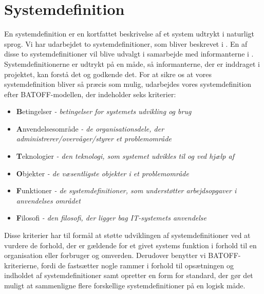 \section{Systemdefinition}
\label{sec:systemdefinition}

En systemdefinition er en kortfattet beskrivelse af et system udtrykt i naturligt sprog. Vi har udarbejdet to systemdefinitioner, som bliver beskrevet i . En af disse to systemdefinitioner vil blive udvalgt i samarbejde med informanterne i  . Systemdefinitionerne er udtrykt på en måde, så informanterne, der er inddraget i projektet, kan forstå det og godkende det. For at sikre os at vores systemdefinition bliver så præcis som mulig, udarbejdes vores systemdefinition efter BATOFF-modellen, der indeholder seks kriterier\cite[s.~37]{ooad}:

\begin{itemize}[noitemsep]
\item \textbf{B}etingelser \textit{- betingelser for systemets udvikling og brug}
\item \textbf{A}nvendelsesområde \textit{- de organisationsdele, der administrerer/overvåger/styrer et problemområde}
\item \textbf{T}eknologier \textit{- den teknologi, som systemet udvikles til og ved hjælp af}
\item \textbf{O}bjekter \textit{- de væsentligste objekter i et problemområde}
\item \textbf{F}unktioner \textit{- de systemdefinitioner, som understøtter arbejdsopgaver i anvendelses området}
\item \textbf{F}ilosofi \textit{- den filosofi, der ligger bag IT-systemets anvendelse}
\end{itemize}

Disse kriterier har til formål at støtte udviklingen af systemdefinitioner ved at vurdere de forhold, der er gældende for et givet systems funktion i forhold til en organisation eller forbruger og omverden. Derudover benytter vi BATOFF-kriterierne, fordi de fastsætter nogle rammer i forhold til opsætningen og indholdet af systemdefinitioner samt opretter en form for standard, der gør det muligt at sammenligne flere forskellige systemdefinitioner på en logisk måde.




